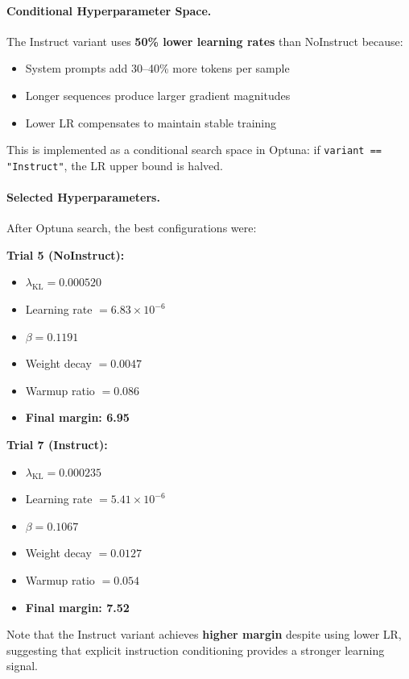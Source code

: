\paragraph{Conditional Hyperparameter Space.} The Instruct variant uses \textbf{50\% lower learning rates} than NoInstruct because:
\begin{itemize}[leftmargin=*]
    \item System prompts add 30--40\% more tokens per sample
    \item Longer sequences produce larger gradient magnitudes
    \item Lower LR compensates to maintain stable training
\end{itemize}

This is implemented as a conditional search space in Optuna: if \texttt{variant == "Instruct"}, the LR upper bound is halved.

\paragraph{Selected Hyperparameters.} After Optuna search, the best configurations were:

\textbf{Trial 5 (NoInstruct):}
\begin{itemize}[leftmargin=*]
    \item $\lambda_{\text{KL}} = 0.000520$
    \item Learning rate $= 6.83 \times 10^{-6}$
    \item $\beta = 0.1191$
    \item Weight decay $= 0.0047$
    \item Warmup ratio $= 0.086$
    \item \textbf{Final margin: 6.95}
\end{itemize}

\textbf{Trial 7 (Instruct):}
\begin{itemize}[leftmargin=*]
    \item $\lambda_{\text{KL}} = 0.000235$
    \item Learning rate $= 5.41 \times 10^{-6}$
    \item $\beta = 0.1067$
    \item Weight decay $= 0.0127$
    \item Warmup ratio $= 0.054$
    \item \textbf{Final margin: 7.52}
\end{itemize}

Note that the Instruct variant achieves \textbf{higher margin} despite using lower LR, suggesting that explicit instruction conditioning provides a stronger learning signal.

